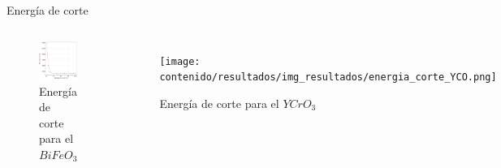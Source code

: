 \begin{frame}{Energ\'ia de corte}
    \begin{columns}[t]
\begin{figure}[H]
    \centering
    \includegraphics[width=1.0\textwidth]{contenido/resultados/img_resultados/energia_corte_BFO.png}
    \caption{Energ\'ia de corte para el $BiFeO_{3}$}
\end{figure}
\begin{figure}[H]
    \centering
    \texttt{[image: contenido/resultados/img\_resultados/energia\_corte\_YCO.png]}
    \caption{Energ\'ia de corte para el $YCrO_{3}$}
\end{figure}
    \end{columns}
\end{frame}


